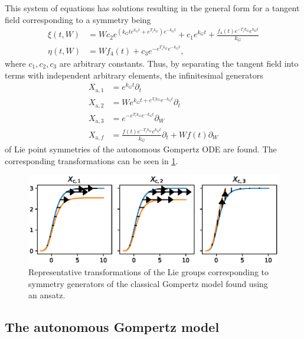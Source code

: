 This system of equations has solutions resulting in the general form for a tangent field corresponding to a symmetry being
\begin{align*}
  \xi{\left(t,W \right)} &= W c_{2} e^{\left(k_{G} t e^{k_{G} t} + e^{T_{i} k_{G}}\right) e^{- k_{G} t}} + c_{1} e^{k_{G} t} + \frac{f_{4}{\left(t \right)} e^{- T_{i} k_{G}} e^{k_{G} t}}{k_{G}} \\
  \eta{\left(t,W \right)} &= W f_{4}{\left(t \right)} + c_{3} e^{- e^{T_{i} k_{G}} e^{- k_{G} t}},
\end{align*}
where \(c_1, c_2, c_3\) are arbitrary constants.
Thus, by separating the tangent field into terms with independent arbitrary elements, the infinitesimal generators
\begin{align*}
  X_{\text{a},1} &= e^{k_{G} t} \partial_t \\
  X_{\text{a},2} &= W e^{k_{G} t + e^{T_{i} k_{G}} e^{- k_{G} t}} \partial_t \\
  X_{\text{a},3} &= e^{- e^{T_{i} k_{G}} e^{- k_{G} t}} \partial_W \\
  X_{\text{a},f} &= \frac{f{\left(t \right)} e^{- T_{i} k_{G}} e^{k_{G} t}}{k_{G}} \partial_t + W f{\left(t \right)} \partial_W
\end{align*}
of Lie point symmetries of the autonomous Gompertz ODE  are found.
The corresponding transformations can be seen in \cref{fig:gompertz-classical-ansatz}.
\begin{figure}
  \centering
  \includegraphics[width=.96\textwidth]{images/gompertz-classical-ansatz}
  \caption{Representative transformations of the Lie groups corresponding to symmetry generators of the classical Gompertz model found using an ansatz.}
  \label{fig:gompertz-classical-ansatz}
\end{figure}

\subsection{The autonomous Gompertz model}

